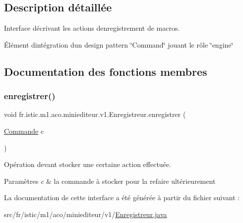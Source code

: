 \subsection{Description détaillée}
Interface décrivant les actions d\textquotesingle{}enregistrement de macros. 

Élément d\textquotesingle{}intégration d\textquotesingle{}un design pattern \char`\"{}\+Command\char`\"{} jouant le rôle \char`\"{}engine\char`\"{} 

\subsection{Documentation des fonctions membres}
\mbox{\label{interfacefr_1_1istic_1_1m1_1_1aco_1_1miniediteur_1_1v1_1_1Enregistreur_a3837fe648c4b3fd41f8746a35dfb9695}} 
\subsubsection{\texorpdfstring{enregistrer()}{enregistrer()}}
{\footnotesize\ttfamily void fr.\+istic.\+m1.\+aco.\+miniediteur.\+v1.\+Enregistreur.\+enregistrer (\begin{DoxyParamCaption}\item[{\hyperlink{interfacefr_1_1istic_1_1m1_1_1aco_1_1miniediteur_1_1v1_1_1Commande}{Commande}}]{c }\end{DoxyParamCaption})}



Opération devant stocker une certaine action effectuée. 


\begin{DoxyParams}{Paramètres}
{\em c} & la commande à stocker pour la refaire ultérieurement \\
\hline
\end{DoxyParams}


La documentation de cette interface a été générée à partir du fichier suivant \+:\begin{DoxyCompactItemize}
\item 
src/fr/istic/m1/aco/miniediteur/v1/\hyperlink{Enregistreur_8java}{Enregistreur.\+java}\end{DoxyCompactItemize}
